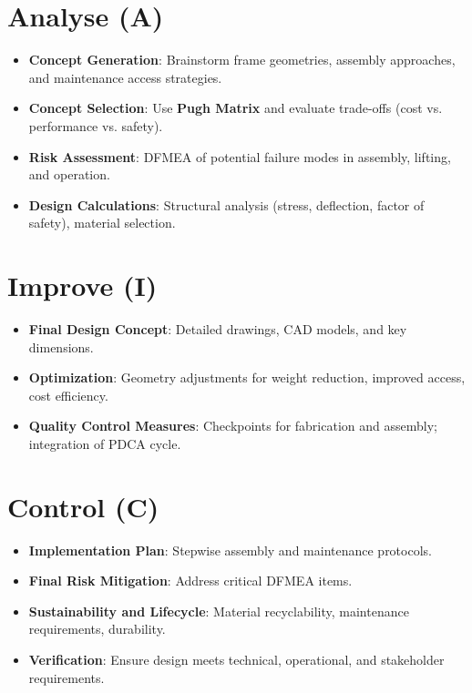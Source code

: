 \documentclass{report}
\begin{document}
\section{Analyse (A)}
\color{red!50!black}
\begin{itemize}[itemsep=-1mm]
	\item \textbf{Concept Generation}: Brainstorm frame geometries, assembly approaches, and maintenance access strategies.
	\item \textbf{Concept Selection}: Use \textbf{Pugh Matrix} and evaluate trade-offs (cost vs. performance vs. safety).
	\item \textbf{Risk Assessment}: DFMEA of potential failure modes in assembly, lifting, and operation.
	\item \textbf{Design Calculations}: Structural analysis (stress, deflection, factor of safety), material selection.
\end{itemize}
\color{black}
\newpage

\section{Improve (I)}
\color{red!50!black}
\begin{itemize}[itemsep=-1mm]
	\item \textbf{Final Design Concept}: Detailed drawings, CAD models, and key dimensions.
	\item \textbf{Optimization}: Geometry adjustments for weight reduction, improved access, cost efficiency.
	\item \textbf{Quality Control Measures}: Checkpoints for fabrication and assembly; integration of PDCA cycle.
\end{itemize}
\color{black}

\newpage

\section{Control (C)}
\color{red!50!black}
\begin{itemize}[itemsep=-1mm]
	\item \textbf{Implementation Plan}: Stepwise assembly and maintenance protocols.
	\item \textbf{Final Risk Mitigation}: Address critical DFMEA items.
	\item \textbf{Sustainability and Lifecycle}: Material recyclability, maintenance requirements, durability.
	\item \textbf{Verification}: Ensure design meets technical, operational, and stakeholder requirements.
\end{itemize}
\color{black}
\end{document}
